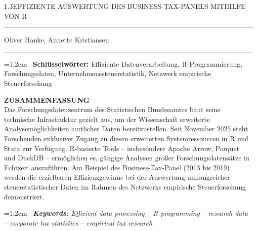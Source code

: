 \documentclass[
  german,
  10pt,
  twoside]{article}
\begin{document}
\begin{titlepage}
\begin{minipage}[t]{11.8cm}
{\LARGE\color{wistaDarkGray}\begin{spacing}{1.3}\MakeUppercase{Effiziente Auswertung des Business-Tax-Panels mithilfe von R}\end{spacing}}

\vspace{-0.2cm}

{\color{wistaBlue}\rule{\linewidth}{0.5pt}}

\vspace{0.5cm}

{\large\color{wistaDarkGray} Oliver Hauke, Annette Kristiansen}

\vspace{0.05cm}

{\color{wistaBlue}\rule{\linewidth}{0.5pt}}

\vspace{0.5cm}

\hangindent=1.2em
{\color{wistaBlue}\ {\bfseries Schlüsselwörter:} Effiziente Datenverarbeitung, R-Programmierung, Forschungsdaten, Unternehmenssteuerstatistik, Netzwerk empirische Steuerforschung}

\vspace{0.3cm}

{\color{wistaDarkGray}\bfseries\MakeUppercase{Zusammenfassung}}\\[0.15cm]
\small
Das Forschungsdatenzentrum des Statistischen Bundesamtes baut seine technische Infrastruktur gezielt aus, um der Wissenschaft erweiterte Analysemöglichkeiten amtlicher Daten bereitzustellen. Seit November 2025 steht Forschenden exklusiver Zugang zu diesen erweiterten Systemressourcen in R und Stata zur Verfügung. R-basierte Tools -- insbesondere Apache Arrow, Parquet und DuckDB -- ermöglichen es, gängige Analysen großer Forschungsdatensätze in Echtzeit auszuführen. Am Beispiel des Business-Tax-Panel (2013 bis 2019) werden die erzielbaren Effizienzgewinne bei der Auswertung umfangreicher steuerstatistischer Daten im Rahmen des Netzwerks empirische Steuerforschung demonstriert.

\vspace{0.5cm}

\hangindent=1.2em
{\itshape\color{wistaBlue}\ {\bfseries Keywords:} Efficient data processing -- R programming -- research data -- corporate tax statistics -- empirical tax research}


\end{minipage}
\end{titlepage}
\end{document}

